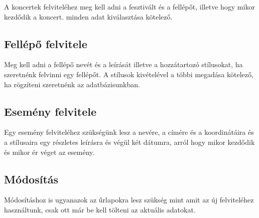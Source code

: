 A koncertek felviteléhez meg kell adni a fesztivált és a fellépőt, illetve hogy mikor kezdődik a koncert. minden adat kiválasztása kötelező.

\subsection{Fellépő felvitele}

Meg kell adni a fellépő nevét és a leírását illetve a hozzátartozó stílusokat, ha szeretnénk felvinni egy fellépőt. A stílusok kivételével a többi megadása kötelező, ha rögzíteni szeretnénk az adatbázisunkban.

\subsection{Esemény felvitele}

Egy esemény felviteléhez szükségünk lesz a nevére, a címére és a koordinátáira és a stílusaira egy részletes leírásra és végül két dátumra, arról hogy mikor kezdődik és mikor ér véget az esemény.

\subsection{Módosítás}

Módosításhoz is ugyanazok az űrlapokra lesz szükség mint amit az új felviteléhez használtunk, csak ott már be kell tölteni az aktuális adatokat.

